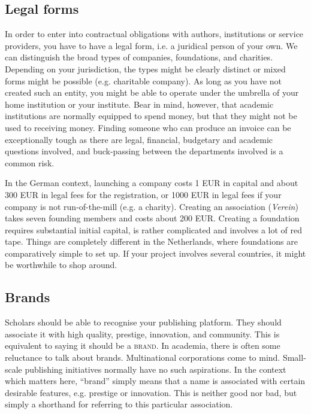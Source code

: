 \documentclass[nonflat,smallfont
]{langsci/langscibook}
\begin{document}
\subsection{Legal forms}\label{sec:legalform}
In order to enter into contractual obligations with authors, institutions or service providers, you have to have a legal form, i.e. a juridical person of your own. We can distinguish the broad types of companies, foundations, and charities. Depending on your jurisdiction, the types might be clearly distinct or mixed forms might be possible (e.g. charitable company). As long as you have not created such an entity, you might be able to operate under the umbrella of your home institution or your institute. Bear in mind, however, that academic institutions are normally equipped to spend money, but that they might not be used to receiving money. Finding someone who can produce an invoice can be exceptionally tough as there are legal, financial, budgetary and academic questions involved, and buck-passing between the departments involved is a common risk. 

In the German context, launching a company costs 1 EUR in capital and about 300 EUR in legal fees for the registration, or 1000 EUR in legal fees if your company is not run-of-the-mill (e.g. a charity). Creating an association (\textit{Verein}) takes seven founding members and costs about 200 EUR. 
Creating a foundation requires substantial initial capital, is rather complicated and involves a lot of red tape. Things are completely different in the Netherlands, where foundations are comparatively simple to set up. If your project involves several countries, it might be worthwhile to shop around. 

\subsection{Brands}\label{sec:legal:brand}
Scholars should be able to recognise your publishing platform. They should associate it with high quality, prestige, innovation, and community. This is equivalent to saying it should be a \textsc{brand}. In academia, there is often some reluctance to talk about brands. Multinational corporations come to mind. Small-scale publishing initiatives normally have no such aspirations. In the context which matters here, ``brand'' simply means that a name is associated with certain desirable features, e.g. prestige or innovation. This is neither good nor bad, but simply a shorthand for referring to this particular association. 
\end{document}

